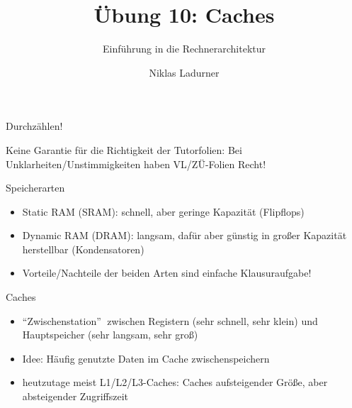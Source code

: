\documentclass[
  german,            %
  aspectratio=169,    %
]{tumbeamer}
\title{Übung 10: Caches}
\subtitle{Einführung in die Rechnerarchitektur}
\author{Niklas Ladurner}
\institute{\theChairName\\\theDepartmentName\\\theUniversityName}
\date{\DTMdisplaydate{2024}{1}{5}{-1}}
\begin{document}
\maketitle

\begin{frame}[c]{}{}
  \begin{center}
    \LARGE  Durchzählen!
  \end{center}
\end{frame}

\begin{frame}[c]{}{}
  \begin{center}
    \LARGE  Keine Garantie für die Richtigkeit der Tutorfolien: Bei Unklarheiten/Unstimmigkeiten
    haben VL/ZÜ-Folien Recht!
  \end{center}
\end{frame}

\begin{frame}[fragile, c]{Speicherarten}{}
  \begin{itemize}
    \item Static RAM (SRAM): schnell, aber geringe Kapazität (Flipflops)
    \item Dynamic RAM (DRAM): langsam, dafür aber günstig in großer Kapazität herstellbar (Kondensatoren)
    \item Vorteile/Nachteile der beiden Arten sind einfache Klausuraufgabe!
  \end{itemize}

\end{frame}

\begin{frame}[fragile, c]{Caches}{}
  \begin{itemize}
    \item \enquote{Zwischenstation} $\;$zwischen Registern (sehr schnell, sehr klein) und Hauptspeicher (sehr langsam, sehr groß)
    \item Idee: Häufig genutzte Daten im Cache zwischenspeichern
    \item heutzutage meist L1/L2/L3-Caches: Caches aufsteigender Größe, aber absteigender Zugriffszeit 
  \end{itemize}
\end{frame}
\end{document}
